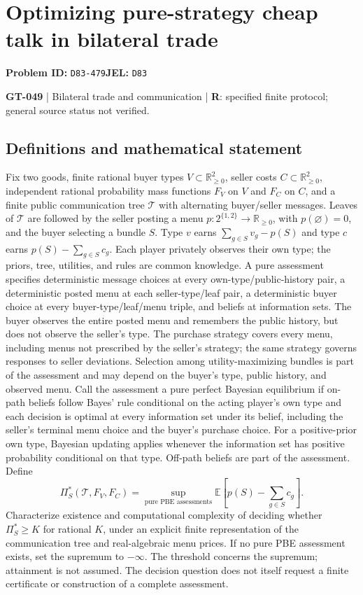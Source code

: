 \documentclass[11pt,a4paper]{article}
\begin{document}
\section*{Optimizing pure-strategy cheap talk in bilateral trade}
\textbf{Problem ID:} \texttt{D83-479}\quad \textbf{JEL:} \texttt{D83}\par
\label{problem:OP-0179}
\label{game:GT-049}
{\sffamily\small\color{muted}
\textbf{GT-049} | Bilateral trade and communication | \textbf{R}: specified finite protocol; general source status not verified.
\par}
\subsection*{Definitions and mathematical statement}
Fix two goods, finite rational buyer types $V\subset\mathbb R_{\geq0}^2$, seller costs $C\subset\mathbb R_{\geq0}^2$, independent rational probability mass functions $F_V$ on $V$ and $F_C$ on $C$, and a finite public communication tree $\mathcal T$ with alternating buyer/seller messages. Leaves of $\mathcal T$ are followed by the seller posting a menu $p:2^{\{1,2\}}\to\mathbb R_{\geq0}$, with $p(\varnothing)=0$, and the buyer selecting a bundle $S$. Type $v$ earns $\sum_{g\in S}v_g-p(S)$ and type $c$ earns $p(S)-\sum_{g\in S}c_g$.
Each player privately observes their own type; the priors, tree, utilities, and rules are common knowledge. A pure assessment specifies deterministic message choices at every own-type/public-history pair, a deterministic posted menu at each seller-type/leaf pair, a deterministic buyer choice at every buyer-type/leaf/menu triple, and beliefs at information sets. The buyer observes the entire posted menu and remembers the public history, but does not observe the seller's type. The purchase strategy covers every menu, including menus not prescribed by the seller's strategy; the same strategy governs responses to seller deviations. Selection among utility-maximizing bundles is part of the assessment and may depend on the buyer's type, public history, and observed menu. Call the assessment a pure perfect Bayesian equilibrium if on-path beliefs follow Bayes' rule conditional on the acting player's own type and each decision is optimal at every information set under its belief, including the seller's terminal menu choice and the buyer's purchase choice. For a positive-prior own type, Bayesian updating applies whenever the information set has positive probability conditional on that type. Off-path beliefs are part of the assessment. Define
\[
 \Pi_S^*(\mathcal T,F_V,F_C)=
 \sup_{\text{pure PBE assessments}}\mathbb E\left[p(S)-\sum_{g\in S}c_g\right].
\]
Characterize existence and computational complexity of deciding whether $\Pi_S^*\geq K$ for rational $K$, under an explicit finite representation of the communication tree and real-algebraic menu prices. If no pure PBE assessment exists, set the supremum to $-\infty$. The threshold concerns the supremum; attainment is not assumed. The decision question does not itself request a finite certificate or construction of a complete assessment.
\end{document}
